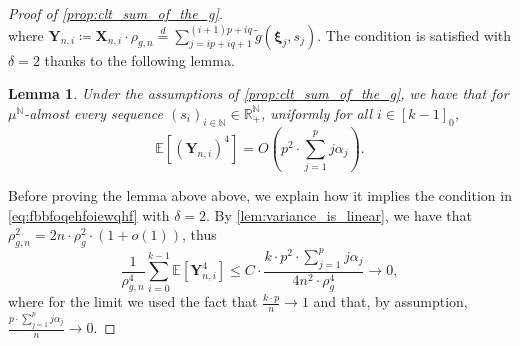\documentclass[11pt,a4paper,oneside]{article}
\newtheorem{lem}[thm]{Lemma}
\theoremstyle{definition}
\theoremstyle{remark}
\def\N{\mathbb{N}}
\def\E{\mathbb{E}}
\def\R{\mathbb{R}}
\begin{document}
\begin{proof}[Proof of \cref{prop:clt_sum_of_the_g}]
\begin{equation}
	\end{equation}
	where $\bm Y_{n,i} \coloneqq \bm X_{n,i} \cdot \rho_{g,n} \stackrel{d}{=} \sum_{j=ip+iq+1}^{(i+1)p+iq} \tilde{g} \left( \bm \xi_j, s_j \right)$.
	The condition is satisfied with $\delta=2$ thanks to the following lemma. 
	\begin{lem}\label{lem:CLT_bound_fourth_moment}
		Under the assumptions of  \cref{prop:clt_sum_of_the_g}, we have that for $\mu^{\N}$-almost every sequence $(s_i)_{{i\in\N}}\in\R^{\N}_{+}$, uniformly for all $i \in [k-1]_0$, 
		\begin{equation}
			\E \left[ \left( \bm Y_{n,i} \right)^4 \right] = O \left( p^2 \cdot \sum_{j=1}^{p} j\alpha_j \right).
		\end{equation}
	\end{lem}
	Before proving the lemma above above, we explain how it implies the condition in \cref{eq:fbbfoqehfoiewqhf} with $\delta=2$. By \cref{lem:variance_is_linear}, we have that $\rho_{g,n}^2 = 2 n \cdot \rho^2_g \cdot (1+o(1))$, thus
	\begin{equation} 
		  \frac{1}{\rho_{g,n}^4 } \sum_{i=0}^{k-1}  \E \left[ \bm Y_{n,i}^4 \right] 
		 \leq 
		  C \cdot \frac{k\cdot p^2 \cdot \sum_{j=1}^{p} j\alpha_j}{4 n^2 \cdot \rho^4_g} \to 0,
	\end{equation}
	where for the limit we used the fact that $ \frac{k\cdot p}{n} \to 1$ and that, by assumption, $ \frac{ p \cdot \sum_{j=1}^{p} j\alpha_j}{n} \to 0$.
	
	\medskip
	

\end{proof}
\end{document}
